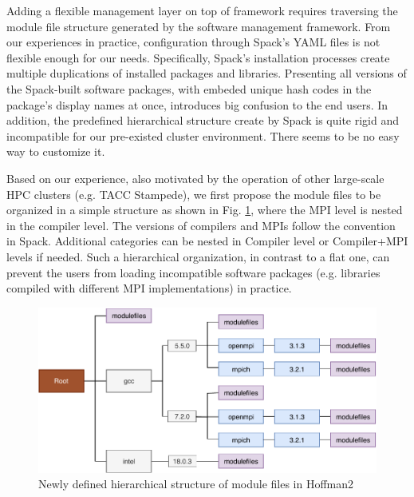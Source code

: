 \documentclass[conference]{IEEEtran}
\begin{document}
Adding a flexible management layer on top of framework requires traversing the module file structure generated by the software management framework.
From our experiences in practice, configuration through Spack's YAML files is not flexible enough for our needs.
Specifically, Spack's installation processes create multiple duplications of installed packages and libraries. Presenting all versions of the Spack-built software packages, with embeded unique hash codes in the package's display names at once, introduces big confusion to the end users.
In addition, the predefined hierarchical structure create by Spack is quite rigid and incompatible for our pre-existed cluster environment. There seems to be no easy way to customize it. 

Based on our experience, also motivated by the operation of other large-scale HPC clusters (e.g. TACC Stampede), we first propose the module files to be organized in a simple structure as shown in Fig. \ref{fig:h2_new_hier}, where the MPI level is nested in the compiler level. 
The versions of compilers and MPIs follow the convention in Spack. 
Additional categories can be nested in Compiler level or Compiler+MPI levels if needed. Such a hierarchical organization, in contrast to a flat one, can prevent the users from loading incompatible software packages (e.g. libraries compiled with different MPI implementations) in practice.

\begin{figure}[htbp]
  \centerline{\includegraphics[width=\linewidth]{figures/h2_new_hier}}
  \caption{Newly defined hierarchical structure of module files in Hoffman2}
  \label{fig:h2_new_hier}
\end{figure}
\end{document}
